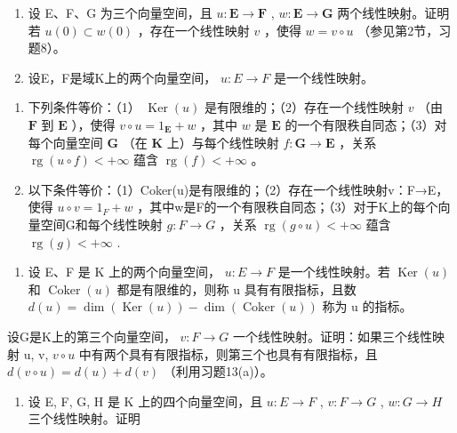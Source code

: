\begin{enumerate}
\def\labelenumi{\arabic{enumi}.}
\setcounter{enumi}{13}
\item
  设 E、F、G 为三个向量空间，且 \(u: \mathbf{E} \to \mathbf{F}\) , \(w: \mathbf{E} \to \mathbf{G}\) 两个线性映射。证明若 \(u(0) \subset w(0)\) ，存在一个线性映射 \(v\) ，使得 \(w = v \circ u\) （参见第2节，习题8）。
\item
  设E，F是域K上的两个向量空间， \(u: E \rightarrow F\) 是一个线性映射。
\end{enumerate}

\begin{enumerate}
\def\labelenumi{(\alph{enumi})}
\item
  下列条件等价：（1） \(\operatorname{Ker}(u)\) 是有限维的；（2）存在一个线性映射 \(v\) （由 \(\mathbf{F}\) 到 \(\mathbf{E}\) ），使得 \(v \circ u = 1_{\mathbf{E}} + w\) ，其中 \(w\) 是 \(\mathbf{E}\) 的一个有限秩自同态；（3）对每个向量空间 \(\mathbf{G}\) （在 \(\mathbf{K}\) 上）与每个线性映射 \(f: \mathbf{G} \to \mathbf{E}\) ，关系 \(\operatorname{rg}(u \circ f) < +\infty\) 蕴含 \(\operatorname{rg}(f) < +\infty\) 。
\item
  以下条件等价：（1）Coker(u)是有限维的；（2）存在一个线性映射v：F→E，使得 \(u \circ v = 1_{F} + w\) ，其中w是F的一个有限秩自同态；（3）对于K上的每个向量空间G和每个线性映射 \(g: F \to G\) ，关系 \(\operatorname{rg}(g \circ u) < +\infty\) 蕴含 \(\operatorname{rg}(g) < +\infty\) .
\end{enumerate}

\begin{enumerate}
\def\labelenumi{\arabic{enumi}.}
\setcounter{enumi}{15}
\tightlist
\item
  设 E、F 是 K 上的两个向量空间， \(u: E \to F\) 是一个线性映射。若 \(\operatorname{Ker}(u)\) 和 \(\operatorname{Coker}(u)\) 都是有限维的，则称 u 具有有限指标，且数 \(d(u) = \dim(\operatorname{Ker}(u)) - \dim(\operatorname{Coker}(u))\) 称为 u 的指标。
\end{enumerate}

设G是K上的第三个向量空间， \(v: F \rightarrow G\) 一个线性映射。证明：如果三个线性映射 u, v, \(v \circ u\) 中有两个具有有限指标，则第三个也具有有限指标，且 \(d(v \circ u) = d(u) + d(v)\) （利用习题13(a)）。

\begin{enumerate}
\def\labelenumi{\arabic{enumi}.}
\setcounter{enumi}{16}
\tightlist
\item
  设 E, F, G, H 是 K 上的四个向量空间，且 \(u: E \rightarrow F\) , \(v: F \rightarrow G\) , \(w: G \rightarrow H\) 三个线性映射。证明
\end{enumerate}

